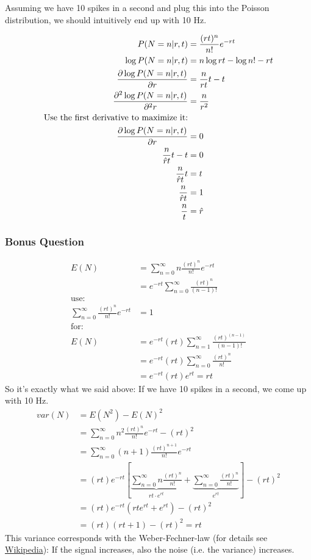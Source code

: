 \documentclass[../main/Notes.tex]{subfiles}
\begin{document}
Assuming we have 10 spikes in a second and plug this into the Poisson distribution, we should intuitively end up with 10 Hz.

\begin{align*}\index{Maximum likelihood}
P(N=n|r,t) &= \frac{(rt)^n}{n!} e^{-rt} \\
\log{P(N=n|r,t)} &= n \log{rt} - \log{n!} - rt \\
\frac{\partial\log{P(N=n|r,t)}}{\partial r} &= \frac{n}{rt}t-t \\
\frac{\partial^2\log{P(N=n|r,t)}}{\partial^2 r} &= \frac{n}{r^2} \\
\text{Use the first derivative to maximize it:}\\
\frac{\partial\log{P(N=n|r,t)}}{\partial r} &= 0 \\
\frac{n}{\est{r}t}t-t &= 0 \\
\frac{n}{\est{r}t}t &= t \\
\frac{n}{\est{r}t} &= 1 \\
\frac{n}{t} &= \est{r}
\end{align*}

\subsubsection*{Bonus Question}
\begin{align*}
E(N) &= \sum_{n=0}^\infty{n \frac{(rt)^n}{n!} e^{-rt}} \\
     &= e^{-rt} \sum_{n=0}^\infty{\frac{(rt)^n}{(n-1)!}} \\
\text{use:}&\\
\sum_{n=0}^\infty{\frac{(rt)^n}{n!} e^{-rt}} &= 1 \\
\text{for:}&\\
E(N) &= e^{-rt} (rt) \sum_{n=1}^\infty{\frac{(rt)^{(n-1)}}{(n-1)!}} \\
     &= e^{-rt} (rt) \sum_{n=0}^\infty{\frac{(rt)^{n}}{n!}} \\
     &= e^{-rt} (rt) e^{rt} = rt
\end{align*}
So it's exactly what we said above: If we have 10 spikes in a second, we come up with 10 Hz.
\begin{align*}
var(N) &= E(N^2)-E(N)^2 \\
       &= \sum_{n=0}^\infty{n^2 \frac{(rt)^n}{n!} e^{-rt}} - (rt)^2 \\
       &= \sum_{n=0}^\infty{(n+1) \frac{(rt)^{n+1}}{n!} e^{-rt}} \\
       &= (rt)e^{-rt}\left[ \underbrace{ \sum_{n=0}^\infty{n \frac{(rt)^n}{n!}} }_{rt\cdot e^{rt}} +  \underbrace{ \sum_{n=0}^\infty{\frac{(rt)^n}{n!}} }_{e^{rt}} \right] - (rt)^2 \\
       &= (rt)e^{-rt}\left(rt e^{rt}+e^{rt}\right) - (rt)^2 \\
       &= (rt)(rt+1)-(rt)^2 = rt
\end{align*}
This variance corresponds with the Weber-Fechner-law (for details see \href{http://en.wikipedia.org/wiki/Weber-Fechner_law}{Wikipedia}): If the signal increases, also the noise (i.e. the variance) increases.
\end{document}
